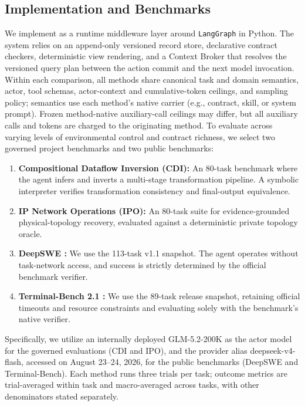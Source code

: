 \subsection{Implementation and Benchmarks}
We implement \method{} as a runtime middleware layer around \texttt{LangGraph} in Python.
The system relies on an append-only versioned record store, declarative contract checkers, deterministic view rendering, and
a Context Broker that resolves the versioned query plan between the action commit and the next model invocation.
Within each comparison, all methods share canonical task and domain semantics, actor, tool schemas, actor-context and cumulative-token ceilings, and sampling policy; semantics use each method's native carrier (e.g., contract, skill, or system prompt). Frozen method-native auxiliary-call ceilings may differ, but all auxiliary calls and tokens are charged to the originating method.
To evaluate \method{} across varying levels of environmental control and contract richness,
we select two governed project benchmarks and two public benchmarks:
\begin{enumerate}
    \item \textbf{Compositional Dataflow Inversion (CDI):} An 80-task benchmark where the agent infers and inverts a multi-stage transformation pipeline. A symbolic interpreter verifies transformation consistency and final-output equivalence.
    \item \textbf{IP Network Operations (IPO):} An 80-task suite for evidence-grounded physical-topology recovery, evaluated against a deterministic private topology oracle.
    \item \textbf{DeepSWE \cite{deepswebenchmark,deepswev11}:} We use the 113-task v1.1 snapshot. The agent operates without task-network access, and success is strictly determined by the official benchmark verifier.
    \item \textbf{Terminal-Bench 2.1 \cite{terminalbench21,terminalbench21release}:} We use the 89-task release snapshot, retaining official timeouts and resource constraints and evaluating solely with the benchmark's native verifier.
\end{enumerate}
Specifically, we utilize an internally deployed GLM-5.2-200K as the actor model for the governed evaluations (CDI and IPO),
and the provider alias deepseek-v4-flash, accessed on August 23--24, 2026, for the public benchmarks (DeepSWE and Terminal-Bench). Each method runs three trials per task; outcome metrics are trial-averaged within task and macro-averaged across tasks, with other denominators stated separately.
